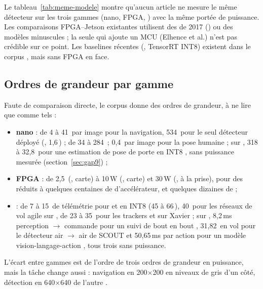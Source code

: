 Le tableau~\ref{tab:meme-modele} montre qu'aucun article ne mesure le même détecteur sur
les trois gammes (nano, FPGA, ) avec la même portée de puissance. Les comparaisons
FPGA--Jetson existantes utilisent des  de 2017 () ou des modèles minuscules ; la
seule qui ajoute un MCU (Elhence et al.) n'est pas crédible sur ce point. Les baselines
 récentes (, TensorRT INT8) existent dans le corpus
\citep{arxiv-2502.15737-performance-analysis-you-only-look}, mais sans FPGA en face.

\subsection{Ordres de grandeur par gamme}

Faute de comparaison directe, le corpus donne des ordres de grandeur, à ne lire que
comme tels :
\begin{itemize}
  \item \textbf{nano} : de 4 à 41\, par image pour la navigation, 534\, pour le
    seul détecteur déployé (, 1,6\,) ; de 34 à 284\, ; 0,4\, par image pour
    la pose humaine \citep[§V-B]{arxiv-2103.10873-fully-onboard-ai-powered-human}\pp ;
    sur , 318\, à 32,8\, pour une estimation de pose de porte en INT8
    \citep[§V]{arxiv-2603.02936-self-supervised-domain-adaptation-visual}\pp, sans
    puissance mesurée (section~\ref{sec:gap9}) ;
  \item \textbf{FPGA} : de 2,5\, (, carte) à 10\,W (, carte) et 30\,W (,
    à la prise), pour des  réduits à quelques centaines de  d'accélérateur, et
    quelques dizaines de  ;
  \item \textbf{} : de 7 à 15\, de télémétrie pour  et  en INT8
    (45 à 66\,), 40\, pour les réseaux de vol agile sur , de 23 à 35\, pour les
    trackers et  sur Xavier ; sur , 8,2\,ms perception $\rightarrow$ commande
    pour un suivi de bout en bout \citep[§IV-B]{arxiv-2505.06923-yopov2-tracker-end-end-agile}\pp,
    31,82\, en vol pour le détecteur air $\rightarrow$ air de SCOUT
    \citep[Table~III]{arxiv-2609.21005-project-scout-interceptor-drone-perimeter}\pp{} et
    50,65\,ms par action pour un modèle vision-langage-action
    \citep[§6.1]{arxiv-2605.00884-litevla-h-dual-rate-vision}\pp, tous trois sans puissance.
\end{itemize}
L'écart entre gammes est de l'ordre de trois ordres de grandeur en puissance, mais la
tâche change aussi : navigation en 200$\times$200 en niveaux de gris d'un côté, détection
en 640$\times$640 de l'autre \deduit.

